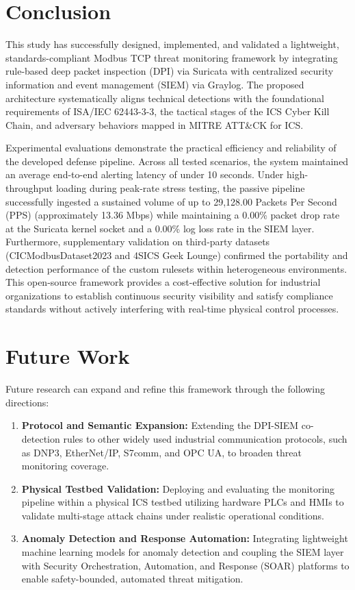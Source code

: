 \section{Conclusion}
This study has successfully designed, implemented, and validated a lightweight, standards-compliant Modbus TCP threat monitoring framework by integrating rule-based deep packet inspection (DPI) via Suricata with centralized security information and event management (SIEM) via Graylog. The proposed architecture systematically aligns technical detections with the foundational requirements of ISA/IEC 62443-3-3, the tactical stages of the ICS Cyber Kill Chain, and adversary behaviors mapped in MITRE ATT\&CK for ICS.

Experimental evaluations demonstrate the practical efficiency and reliability of the developed defense pipeline. Across all tested scenarios, the system maintained an average end-to-end alerting latency of under 10 seconds. Under high-throughput loading during peak-rate stress testing, the passive pipeline successfully ingested a sustained volume of up to 29,128.00 Packets Per Second (PPS) (approximately 13.36 Mbps) while maintaining a 0.00\% packet drop rate at the Suricata kernel socket and a 0.00\% log loss rate in the SIEM layer. Furthermore, supplementary validation on third-party datasets (CICModbusDataset2023 and 4SICS Geek Lounge) confirmed the portability and detection performance of the custom rulesets within heterogeneous environments. This open-source framework provides a cost-effective solution for industrial organizations to establish continuous security visibility and satisfy compliance standards without actively interfering with real-time physical control processes.

\section{Future Work}
Future research can expand and refine this framework through the following directions:

\begin{enumerate}
    \item \textbf{Protocol and Semantic Expansion:} Extending the DPI-SIEM co-detection rules to other widely used industrial communication protocols, such as DNP3, EtherNet/IP, S7comm, and OPC UA, to broaden threat monitoring coverage.
    \item \textbf{Physical Testbed Validation:} Deploying and evaluating the monitoring pipeline within a physical ICS testbed utilizing hardware PLCs and HMIs to validate multi-stage attack chains under realistic operational conditions.
    \item \textbf{Anomaly Detection and Response Automation:} Integrating lightweight machine learning models for anomaly detection and coupling the SIEM layer with Security Orchestration, Automation, and Response (SOAR) platforms to enable safety-bounded, automated threat mitigation.
\end{enumerate}